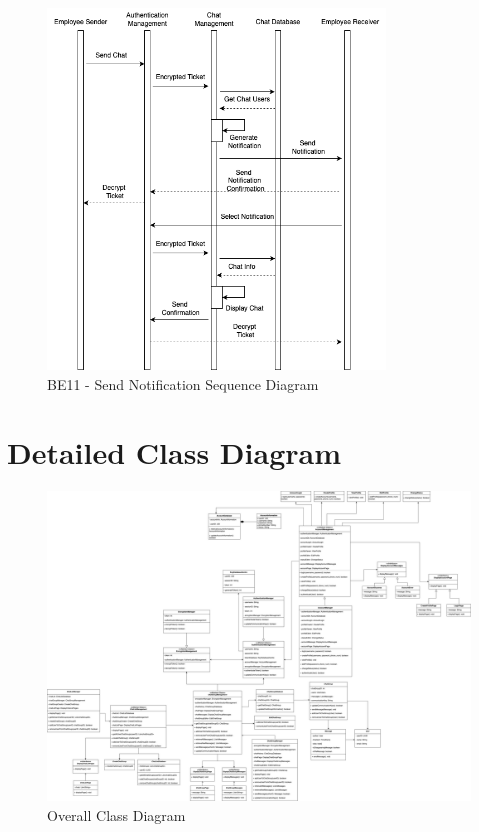 \documentclass[]{article}
\begin{document}
\begin{figure}[H]
	\centering
	\includegraphics[width=0.8\textwidth]{BE11.png}
	\caption{BE11 - Send Notification Sequence Diagram}
\end{figure}




\section{Detailed Class Diagram}
\label{sec:detailed_class_diagram}
\renewcommand{\thefigure}{4.\arabic{figure}}
\setcounter{figure}{0}
\begin{figure}[H]
	\centering
	\includegraphics[scale=0.18]{class-diagram.jpg}
	\caption{Overall Class Diagram}
	\label{fig:class-diagram}
\end{figure}
\end{document}
